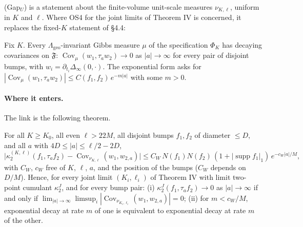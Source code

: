(Gap$_U$) is a statement about the finite-volume unit-scale measures $\nu_{K,\ell}$, uniform in $K$ and $\ell$. Where OS4 for the joint limits of Theorem IV is concerned, it replaces the fixed-$K$ statement of  \S4.4:

\begin{definition}\label{def:open-GapK}
Fix $K$. Every $\Lambda_{\mathrm{geo}}$-invariant Gibbs measure $\mu$ of the specification $\Phi_K$ has decaying covariances on $\mathfrak F$: $\operatorname{Cov}_\mu(w_1,\tau_aw_2)\to0$ as $|a|\to\infty$ for every pair of disjoint bumps, with $w_i=\partial_{t_i}\Delta_\infty(0,\cdot)$. The exponential form asks for $|\operatorname{Cov}_\mu(w_1,\tau_aw_2)|\le C(f_1,f_2)\,e^{-m|a|}$ with some $m>0$.
\end{definition}

\paragraph{Where it enters.} The link is the following theorem.

\begin{theorem}\label{thm:open-W1}
For all $K\ge K_0$, all even $\ell>22M$, all disjoint bumps $f_1,f_2$ of diameter $\le D$, and all $a$ with $4D\le|a|\le\ell/2-2D$,
\[
\bigl|\kappa_2^{(K,\ell)}(f_1,\tau_af_2)-\operatorname{Cov}_{\nu_{K,\ell}}(w_1,w_{2,a})\bigr|
\le C_W\,N(f_1)N(f_2)\,(1+|\operatorname{supp}f_1|_1)\,e^{-c_W|a|/M},
\]
with $C_W$, $c_W$ free of $K$, $\ell$, $a$, and the position of the bumps ($C_W$ depends on $D/M$). Hence, for every joint limit $(K_i,\ell_i)$ of Theorem IV with limit two-point cumulant $\kappa_2^J$, and for every bump pair: (i) $\kappa_2^J(f_1,\tau_af_2)\to0$ as $|a|\to\infty$ if and only if $\lim_{|a|\to\infty}\limsup_i|\operatorname{Cov}_{\nu_{K_i,\ell_i}}(w_1,w_{2,a})|=0$; (ii) for $m<c_W/M$, exponential decay at rate $m$ of one is equivalent to exponential decay at rate $m$ of the other.
\end{theorem}

